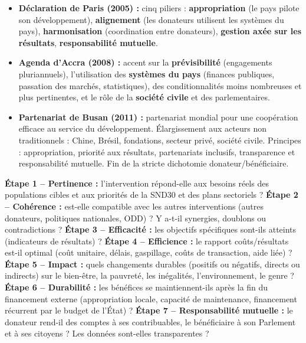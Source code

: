 \documentclass[11pt]{article}
\begin{document}
\begin{aretenir}
\begin{itemize}
    \item \textbf{Déclaration de Paris (2005) :} cinq piliers : \textbf{appropriation} (le pays pilote son développement), \textbf{alignement} (les donateurs utilisent les systèmes du pays), \textbf{harmonisation} (coordination entre donateurs), \textbf{gestion axée sur les résultats}, \textbf{responsabilité mutuelle}.
    \item \textbf{Agenda d'Accra (2008) :} accent sur la \textbf{prévisibilité} (engagements pluriannuels), l'utilisation des \textbf{systèmes du pays} (finances publiques, passation des marchés, statistiques), des conditionnalités moins nombreuses et plus pertinentes, et le rôle de la \textbf{société civile} et des parlementaires.
    \item \textbf{Partenariat de Busan (2011) :} partenariat mondial pour une coopération efficace au service du développement. Élargissement aux acteurs non traditionnels : Chine, Brésil, fondations, secteur privé, société civile. Principes : appropriation, priorité aux résultats, partenariats inclusifs, transparence et responsabilité mutuelle. Fin de la stricte dichotomie donateur/bénéficiaire.
\end{itemize}
\end{aretenir}

\begin{methode}
\textbf{Étape 1 -- Pertinence :} l'intervention répond-elle aux besoins réels des populations cibles et aux priorités de la SND30 et des plans sectoriels ?
\textbf{Étape 2 -- Cohérence :} est-elle compatible avec les autres interventions (autres donateurs, politiques nationales, ODD) ? Y a-t-il synergies, doublons ou contradictions ?
\textbf{Étape 3 -- Efficacité :} les objectifs spécifiques sont-ils atteints (indicateurs de résultats) ?
\textbf{Étape 4 -- Efficience :} le rapport coûts/résultats est-il optimal (coût unitaire, délais, gaspillage, coûts de transaction, aide liée) ?
\textbf{Étape 5 -- Impact :} quels changements durables (positifs ou négatifs, directs ou indirects) sur le bien-être, la pauvreté, les inégalités, l'environnement, le genre ?
\textbf{Étape 6 -- Durabilité :} les bénéfices se maintiennent-ils après la fin du financement externe (appropriation locale, capacité de maintenance, financement récurrent par le budget de l'État) ?
\textbf{Étape 7 -- Responsabilité mutuelle :} le donateur rend-il des comptes à ses contribuables, le bénéficiaire à son Parlement et à ses citoyens ? Les données sont-elles transparentes ?
\end{methode}
\end{document}
